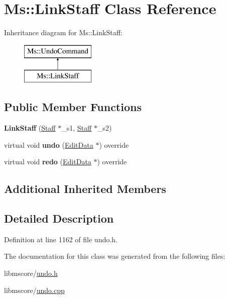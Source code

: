 \hypertarget{class_ms_1_1_link_staff}{}\section{Ms\+:\+:Link\+Staff Class Reference}
\label{class_ms_1_1_link_staff}
Inheritance diagram for Ms\+:\+:Link\+Staff\+:\begin{figure}[H]
\begin{center}
\leavevmode
\includegraphics[height=2.000000cm]{class_ms_1_1_link_staff}
\end{center}
\end{figure}
\subsection*{Public Member Functions}
\begin{DoxyCompactItemize}
\item 
\mbox{\label{class_ms_1_1_link_staff_aeedbeca35a9381188dd1d1784009bd95}} 
{\bfseries Link\+Staff} (\hyperlink{class_ms_1_1_staff}{Staff} $\ast$\+\_\+s1, \hyperlink{class_ms_1_1_staff}{Staff} $\ast$\+\_\+s2)
\item 
\mbox{\label{class_ms_1_1_link_staff_aaaa63323e2c62d1196711482d7658a0f}} 
virtual void {\bfseries undo} (\hyperlink{class_ms_1_1_edit_data}{Edit\+Data} $\ast$) override
\item 
\mbox{\label{class_ms_1_1_link_staff_ae074c894c474786cef28a919b4b1aca1}} 
virtual void {\bfseries redo} (\hyperlink{class_ms_1_1_edit_data}{Edit\+Data} $\ast$) override
\end{DoxyCompactItemize}
\subsection*{Additional Inherited Members}


\subsection{Detailed Description}


Definition at line 1162 of file undo.\+h.



The documentation for this class was generated from the following files\+:\begin{DoxyCompactItemize}
\item 
libmscore/\hyperlink{undo_8h}{undo.\+h}\item 
libmscore/\hyperlink{undo_8cpp}{undo.\+cpp}\end{DoxyCompactItemize}
